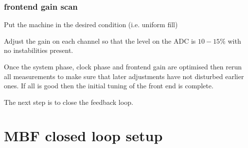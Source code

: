 \documentclass{report}
\begin{document}
\subsubsection{frontend gain scan}
\begin{tcolorbox}[colback=blue!5!white, colframe=blue!75!black, title=\textbf{Machine settings}]
Put the machine in the desired condition (i.e. uniform fill)
\end{tcolorbox}
Adjust the gain on each channel so that the level on the ADC is $10 - 15\%$ with no instabilities present. 

\begin{tcolorbox}
Once the system phase, clock phase and frontend gain are optimised then rerun all measurements to make sure that later adjustments have not disturbed earlier ones. If all is good then the initial tuning of the front end is complete.
\end{tcolorbox}
The next step is to close the feedback loop.
\clearpage
\section{MBF closed loop setup}
\end{document}
